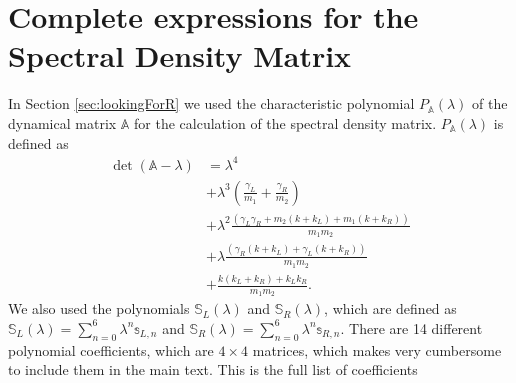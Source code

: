
\chapter{Complete expressions for the Spectral Density Matrix}
\label{Appendix:SpectralDensity}

%
In Section \ref{sec:lookingForR} we used the characteristic polynomial $P_{\mathbb{A}}(\lambda)$ of the dynamical matrix $\mathbb{A}$ for the calculation of the spectral density matrix. $P_{\mathbb{A}}(\lambda)$ is defined as
\begin{equation}
  \begin{split}
    \det(\mathbb{A}-\lambda) &= \lambda ^4 \\&+ \lambda ^3 \left(\frac{\gamma_L}{m_1}+\frac{\gamma_R}{m_2}\right) \\ &+ \lambda^2\frac{ (\gamma_L \gamma_R+m_2 (k+k_L)+m_1 (k+k_R))}{m_1 m_2}\\ &+ \lambda \frac{  (\gamma_R (k+k_L)+\gamma_L (k+k_R))}{m_1 m_2}\\ &+\frac{k (k_L+k_R)+k_L k_R}{m_1 m_2}.
  \end{split}
\end{equation}
%
We also used the polynomials $\mathbb{S}_L(\lambda)$ and $\mathbb{S}_R(\lambda)$, which are defined as $\mathbb{S}_L(\lambda)=\sum\limits_{n=0}^6 \lambda^n \mathbb{s}_{L,n}$ and $\mathbb{S}_R(\lambda)=\sum\limits_{n=0}^6 \lambda^n \mathbb{s}_{R,n}$. There are 14 different polynomial coefficients, which are $4\times 4$ matrices, which makes very cumbersome to include them in the main text. This is the full list of coefficients \\
%
